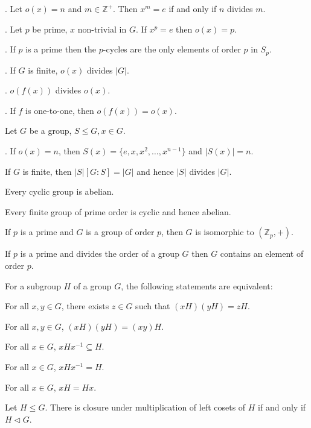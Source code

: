 \documentclass{article}
\newcommand\inv{^{-1}}
\newcommand{\Z}{\mathbb Z}
\begin{document}
\indent{}. Let $o(x)=n$ and $m\in\Z^+$. Then $x^m=e$ if and only if $n$ divides $m$.

\indent{}. Let $p$ be prime, $x$ non-trivial in $G$. If $x^p=e$ then $o(x)=p$.

\indent{}. If $p$ is a prime then the $p$-cycles are the only elements of order $p$ in $S_p$.

\indent{}. If $G$ is finite, $o(x)$ divides $|G|$.

\indent{}. $o(f(x))$ divides $o(x)$.

\indent{}. If $f$ is one-to-one, then $o(f(x)) = o(x)$.


Let $G$ be a group, $S\leq G, x\in G$.

\indent{}. If $o(x)=n$, then $S(x)=\{e,x,x^2,\hdots,x^{n-1}\}$ and $|S(x)|=n$.

\indent{} If $G$ is finite, then $|S|[G:S]=|G|$ and hence $|S|$ divides $|G|$.

\indent\indent Every cyclic group is abelian.

\indent\indent Every finite group of prime order is cyclic and hence abelian.

\indent\indent If $p$ is a prime and $G$ is a group of order $p$, then $G$ is isomorphic to $(\Z_p,+)$.

\newpage
{}

If $p$ is a prime and divides the order of a group $G$ then $G$ contains an element of order $p$.

\newpage
{}

For a subgroup $H$ of a group $G$, the following statements are equivalent:

\indent\indent For all $x,y\in G$, there exists $z \in G$ such that $(xH)(yH)=zH$.

\indent\indent For all $x,y \in G$, $(xH)(yH) = (xy)H$.

\indent\indent For all $x \in G$, $xHx\inv \subseteq H$.

\indent\indent For all $x \in G$, $xHx\inv = H$.

\indent\indent For all $x \in G$, $xH = Hx$.


Let $H \leq G$. There is closure under multiplication of left cosets of $H$ if and only if $H \lhd G$.
\end{document}
